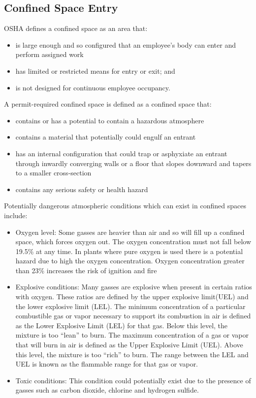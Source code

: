 \subsection{Confined Space Entry}
OSHA defines a confined space as an area that:
\begin{itemize} 
\item is large enough and so configured that an employee's body can enter and perform assigned work
\item has limited or restricted means for entry or exit; and
\item is not designed for continuous employee occupancy.
\end{itemize}
A permit-required confined space is defined as a confined space that:
\begin{itemize} 
\item contains or has a potential to contain a hazardous atmosphere
\item contains a material that potentially could engulf an entrant
\item has an internal configuration that could trap or asphyxiate an entrant through inwardly converging walls or a floor that slopes downward and tapers to a smaller cross-section
\item contains any serious safety or health hazard
\end{itemize}

Potentially dangerous atmospheric conditions which can exist in confined spaces include: 
\begin{itemize}
\item Oxygen level: Some gasses are heavier than air and so will fill up a confined space, which forces oxygen out.  The oxygen concentration must not fall below 19.5\% at any time.  In plants where pure oxygen is used there is a potential hazard due to high the oxygen concentration.  Oxygen concentration greater than 23\% increases the risk of ignition and fire
\item Explosive conditions:  Many gasses are explosive when present in certain ratios with oxygen. These ratios are defined by the upper explosive limit(UEL) and the lower explosive limit (LEL).  The minimum concentration of a particular combustible gas or vapor necessary to support its combustion in air is defined as the Lower Explosive Limit (LEL) for that gas. Below this level, the mixture is too “lean” to burn. The maximum concentration of a gas
or vapor that will burn in air is defined as the Upper Explosive Limit (UEL). Above this level, the mixture is too “rich” to burn.  The range between the LEL and UEL is known as the flammable range for that gas or vapor.  
\item Toxic conditions:  This condition could potentially exist due to the presence of gasses such as carbon dioxide, chlorine and hydrogen sulfide.  
\end{itemize}




